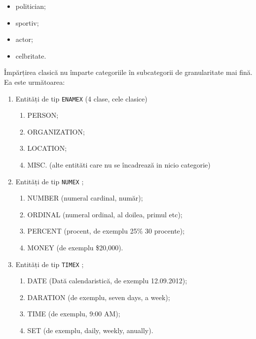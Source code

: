 \begin{itemize}
\item politician;
\item sportiv;
\item actor;
\item celbritate.
\end{itemize}


Împărțirea clasică nu împarte categoriile în subcategorii de granularitate mai fină. Ea este următoarea:

\begin{enumerate}
	\item Entități de tip \texttt{ENAMEX} (4 clase, cele clasice)
	\begin{enumerate}
		\item PERSON;
		\item ORGANIZATION;
		\item LOCATION;
		\item MISC. (alte entităti care nu se încadrează in nicio categorie)
	\end{enumerate}


	\item Entități de tip \texttt{NUMEX} ;

	\begin{enumerate}
		\item NUMBER (numeral cardinal, număr);
		\item ORDINAL (numeral ordinal, al doilea, primul etc);
		\item PERCENT (procent, de exemplu 25\% 30 procente);
		\item MONEY (de exemplu \$20,000).
	\end{enumerate}
	
		\item Entități de tip \texttt{TIMEX} ;
	
		\begin{enumerate}
			\item DATE (Dată calendaristică, de exemplu 12.09.2012);
			\item DARATION (de exemplu, seven days, a week);
			\item TIME (de exemplu, 9:00 AM);
			\item SET (de exemplu, daily, weekly, anually).
		\end{enumerate}


\end{enumerate}
